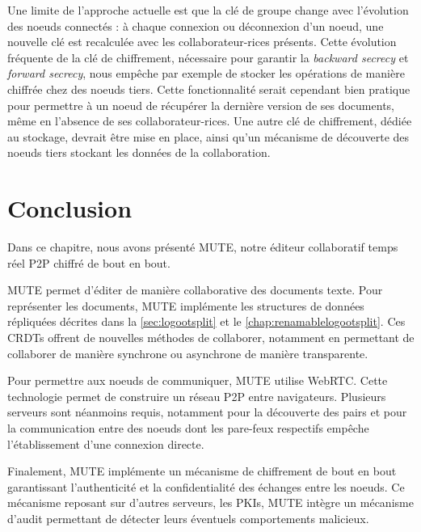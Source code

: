 Une limite de l'approche actuelle est que la clé de groupe change avec l'évolution des noeuds connectés : à chaque connexion ou déconnexion d'un noeud, une nouvelle clé est recalculée avec les collaborateur-rices présents.
Cette évolution fréquente de la clé de chiffrement, nécessaire pour garantir la \emph{backward secrecy} et \emph{forward secrecy}, nous empêche par exemple de stocker les opérations de manière chiffrée chez des noeuds tiers.
Cette fonctionnalité serait cependant bien pratique pour permettre à un noeud de récupérer la dernière version de ses documents, même en l'absence de ses collaborateur-rices.
Une autre clé de chiffrement, dédiée au stockage, devrait être mise en place, ainsi qu'un mécanisme de découverte des noeuds tiers stockant les données de la collaboration.


\section{Conclusion}

Dans ce chapitre, nous avons présenté \acf{MUTE}, notre éditeur collaboratif temps réel \ac{P2P} chiffré de bout en bout.

MUTE permet d'éditer de manière collaborative des documents texte.
Pour représenter les documents, MUTE implémente les structures de données répliquées décrites dans la \autoref{sec:logootsplit} et le \autoref{chap:renamablelogootsplit}.
Ces \acp{CRDT} offrent de nouvelles méthodes de collaborer, notamment en permettant de collaborer de manière synchrone ou asynchrone de manière transparente.

Pour permettre aux noeuds de communiquer, MUTE utilise WebRTC.
Cette technologie permet de construire un réseau \ac{P2P} entre navigateurs.
Plusieurs serveurs sont néanmoins requis, notamment pour la découverte des pairs et pour la communication entre des noeuds dont les pare-feux respectifs empêche l'établissement d'une connexion directe.

Finalement, MUTE implémente un mécanisme de chiffrement de bout en bout garantissant l'authenticité et la confidentialité des échanges entre les noeuds.
Ce mécanisme reposant sur d'autres serveurs, les PKIs, MUTE intègre un mécanisme d'audit permettant de détecter leurs éventuels comportements malicieux.
